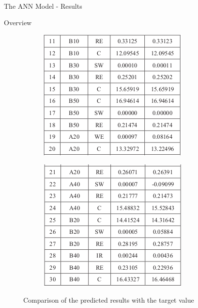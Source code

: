 \documentclass{beamer}
\begin{document}
\begin{frame}{The ANN Model - Results}
\begin{block}{Overview}
\begin{figure}
\begin{subfigure}[b]{0.32\textwidth}
             \includegraphics[width=\textwidth]{Figures/ANN-overview2.png}
         \end{subfigure}
         \hfill
         \begin{subfigure}[b]{0.32\textwidth}
             \centering
             \includegraphics[width=\textwidth]{Figures/ANN-overview3.png}
         \end{subfigure}
         \caption{Comparison of the predicted results with the target value}
    \end{figure}
    \end{block}
\end{frame}
\end{document}
